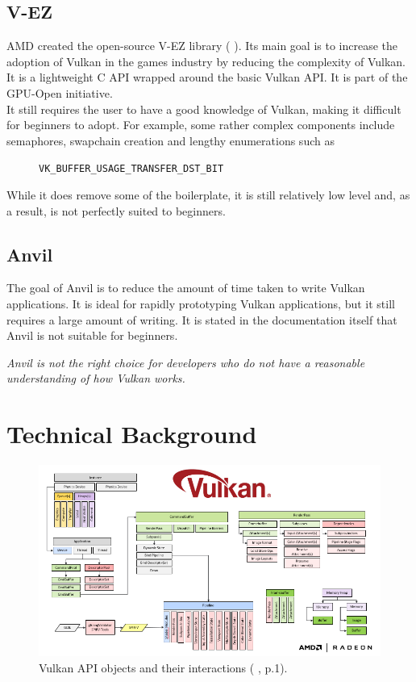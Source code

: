 \documentclass[12pt]{report}
\newcommand{\citediagram}[2]{(\citeauthor{#1} \citeyear{#1}, p.#2)}
\newcommand{\citesoftware}[1]{(\citeauthor{#1} \citeyear{#1})}
\newcommand{\quotebu}[1]
{
  \begin{displayquote}
    \textit{#1}
  \end{displayquote}
}
\theoremstyle{definition}
\begin{document}
    \section{V-EZ}

      AMD created the open-source V-EZ library \citesoftware{vez}. Its main goal is to increase the
      adoption of Vulkan in the games industry by reducing the complexity of
      Vulkan. It is a lightweight C API wrapped around the basic Vulkan API.
      It is part of the GPU-Open initiative. \\
      
      It still requires the user to have a good knowledge of Vulkan, making it
      difficult for beginners to adopt. For example, some rather complex
      components include semaphores, swapchain creation and lengthy
      enumerations such as

        \begin{figure}[h!]
        \centering
        \verb|VK_BUFFER_USAGE_TRANSFER_DST_BIT|
        \end{figure}

      While it does remove some of the boilerplate, it is still relatively low
      level and, as a result, is not perfectly suited to beginners.

    \section{Anvil}

      The goal of Anvil is to reduce the amount of time taken to write Vulkan
      applications. It is ideal for rapidly prototyping Vulkan applications,
      but it still requires a large amount of writing. It is stated in the
      documentation itself that Anvil is not suitable for beginners.

      \quotebu{
        Anvil is not the right choice for developers who do not have a
        reasonable understanding of how Vulkan works.
      }

  \chapter{Technical Background}
  
    \begin{figure}[h]
      \centering
      \includegraphics[width=\textwidth]{images/interactions.png}
      \caption{Vulkan API objects and their interactions \citediagram{vez}{1}.}
      \label{fig:interactions}  
    \end{figure}
\end{document}
